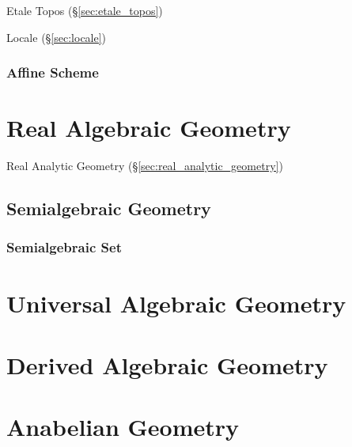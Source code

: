 Etale Topos (\S\ref{sec:etale_topos})

Locale (\S\ref{sec:locale})



\subsubsection{Affine Scheme}\label{sec:affine_scheme}



\section{Real Algebraic Geometry}\label{sec:real_algebraic_geometry}

Real Analytic Geometry (\S\ref{sec:real_analytic_geometry})



\subsection{Semialgebraic Geometry}\label{sec:semialgebraic_geometry}

\subsubsection{Semialgebraic Set}\label{sec:semialgebraic_set}



\section{Universal Algebraic Geometry}\label{sec:universal_geometry}

\section{Derived Algebraic Geometry}
\label{sec:derived_algebraic_geometry}

\section{Anabelian Geometry}\label{sec:anabelian_geometry}
